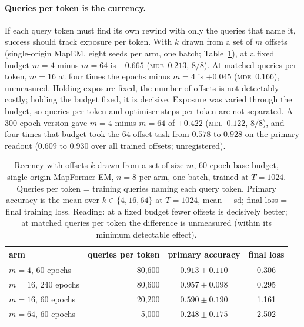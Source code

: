 \documentclass[10pt]{article}
\newcommand{\mde}{\textsc{mde}}
\begin{document}
\paragraph{Queries per token is the currency.} If each query token must find its own rewind with only
the queries that name it, success should track exposure per token. With $k$ drawn from a set of $m$
offsets (single-origin MapEM, eight seeds per arm, one batch; Table~\ref{tab:spread2}), at a fixed budget
$m=4$ minus $m=64$ is $+0.665$ (\mde\ $0.213$, $8/8$). At matched queries per token, $m=16$ at four times
the epochs minus $m=4$ is $+0.045$ (\mde\ $0.166$), unmeasured. Holding exposure fixed, the number of offsets
is not detectably costly; holding the budget fixed, it is decisive. Exposure was varied through the
budget, so queries per token and optimiser steps per token are not separated. A 300-epoch version gave
$m=4$ minus $m=64$ of $+0.422$ (\mde\ $0.122$, $8/8$), and four times that budget took the
64-offset task from $0.578$ to $0.928$ on the primary readout ($0.609$ to $0.930$ over all trained offsets;
unregistered). %

\begin{table}[t]
\centering
\small
\captionsetup{font=footnotesize,skip=4pt}
\caption{Recency with offsets $k$ drawn from a set of size $m$, 60-epoch base budget, single-origin MapFormer-EM, $n=8$ per arm, one batch, trained at $T=1024$. Queries per token = training queries naming each query token. Primary accuracy is the mean over $k\in\{4,16,64\}$ at $T=1024$, mean $\pm$ sd; final loss = final training loss. Reading: at a fixed budget fewer offsets is decisively better; at matched queries per token the difference is unmeasured (within its minimum detectable effect).}
\label{tab:spread2}
\begin{tabular}{@{}lrcc@{}}
\toprule
arm & queries per token & primary accuracy & final loss \\
\midrule
$m=4$, 60 epochs   & 80,600 & $0.913\pm0.110$ & 0.306 \\
$m=16$, 240 epochs & 80,600 & $0.957\pm0.098$ & 0.295 \\
$m=16$, 60 epochs  & 20,200 & $0.590\pm0.190$ & 1.161 \\
$m=64$, 60 epochs  & 5,000  & $0.248\pm0.175$ & 2.502 \\
\bottomrule
\end{tabular}
\end{table}
\end{document}
